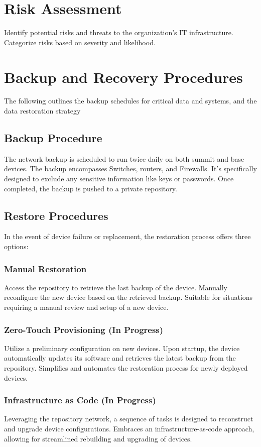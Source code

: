 \section{Risk Assessment}

Identify potential risks and threats to the organization's IT infrastructure.
Categorize risks based on severity and likelihood.

\section{Backup and Recovery Procedures}
The following outlines the backup schedules for critical data and systems, and the data restoration strategy

\subsection{Backup Procedure}
The network backup is scheduled to run twice daily on both summit and base devices. The backup encompasses Switches, routers, and Firewalls. It's specifically designed to exclude any sensitive information like keys or passwords. Once completed, the backup is pushed to a private repository.

\subsection{Restore Procedures}
In the event of device failure or replacement, the restoration process offers three options:

\subsubsection{Manual Restoration}
Access the repository to retrieve the last backup of the device.
Manually reconfigure the new device based on the retrieved backup.
Suitable for situations requiring a manual review and setup of a new device.

\subsubsection{Zero-Touch Provisioning (In Progress)}
Utilize a preliminary configuration on new devices.
Upon startup, the device automatically updates its software and retrieves the latest backup from the repository.
Simplifies and automates the restoration process for newly deployed devices.

\subsubsection{Infrastructure as Code (In Progress)}
Leveraging the repository network, a sequence of tasks is designed to reconstruct and upgrade device configurations.
Embraces an infrastructure-as-code approach, allowing for streamlined rebuilding and upgrading of devices.

